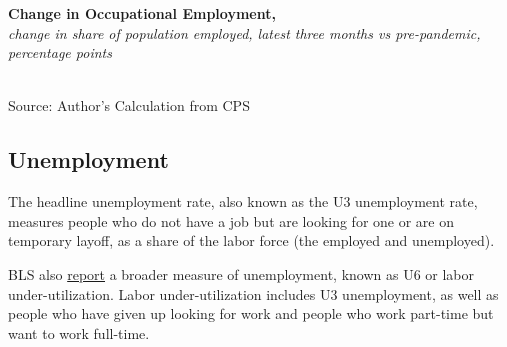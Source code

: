 \documentclass{report}
\newcommand{\tbllink}[1]{\href{https://raw.githubusercontent.com/bdecon/US-chartbook/master/chartbook/data/#1}{\faTable}}
\newcommand{\barylab}[2]{yticklabel style={text width=#1, align=right, 
		style={black!70}, text height=#2},}
\newcommand{\bbar}[2]{extra #1 ticks = {{#2}}, extra #1 tick labels = ,
		extra #1 tick style = {grid=major, grid style={thick, black!25}},}
\begin{document}
{\begin{minipage}{0.76\textwidth}
\normalsize \textbf{Change in Occupational Employment, }\\
\footnotesize{\textit{change in share of population employed, latest three months vs pre-pandemic, percentage points}}\\
\hspace*{-4mm}  \\
\footnotesize{Source: Author's Calculation from CPS} \hfill \tbllink{occs.csv}
\end{minipage}
\newpage
\begin{minipage}{0.76\textwidth} 
\subsection*{Unemployment}
\hypertarget{labu}{}
\vspace{-0.5mm}
\small The headline unemployment rate, also known as the U3 unemployment rate, measures people who do not have a job but are looking for one or are on temporary layoff, as a share of the labor force (the employed and unemployed). 
\end{minipage}

\begin{minipage}{0.26\textwidth}
\small BLS also \href{https://www.bls.gov/news.release/empsit.t15.htm}{report} a broader measure of unemployment, known as U6 or labor under-utilization. Labor under-utilization includes U3 unemployment, as well as people who have given up looking for work and people who work part-time but want to work full-time. 


\end{minipage}}
\end{document}

